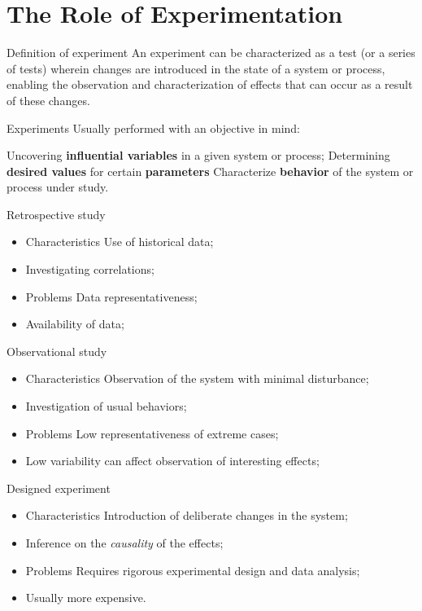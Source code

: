 \part{The Role of Experimentation}
\frame{\partpage}

\begin{frame}{Definition of experiment}
An experiment can be characterized as a test (or a series of tests) wherein changes are introduced in the state of a system or process, enabling the observation and characterization of effects that can occur as a result of these changes.
\end{frame}

\begin{frame}{Experiments}
Usually performed with an objective in mind:

\bitems Uncovering \textbf{influential variables} in a given system or process;
	\spitem Determining \textbf{desired values} for certain \textbf{parameters}
	\spitem Characterize \textbf{behavior} of the system or process under study.
\eitem
\end{frame}

\begin{frame}{Retrospective study}
\begin{itemize}
	\item Characteristics
	\bitems Use of historical data;
	\item Investigating correlations;\eitem
	\item Problems
	\bitems Data representativeness;
	\item Availability of data;\eitem
\end{itemize}
\end{frame}

\begin{frame}{Observational study}
\begin{itemize}
	\item Characteristics
	\bitems Observation of the system with minimal disturbance;
	\item Investigation of usual behaviors;\eitem
	\item Problems
	\bitems Low representativeness of extreme cases;
	\item Low variability can affect observation of interesting effects;\eitem
\end{itemize}
\end{frame}

\begin{frame}{Designed experiment}
\begin{itemize}
	\item Characteristics
	\bitems Introduction of deliberate changes in the system;
		\item Inference on the \textit{causality} of the effects;
		\eitem
	\item Problems
	\bitems Requires rigorous experimental design and data analysis;
	\item Usually more expensive.
	\eitem
\end{itemize}
\end{frame}

